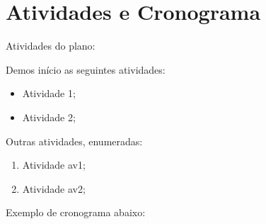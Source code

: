 \section{Atividades e Cronograma}
\label{sec:atividades}

\begin{large}

  Atividades do plano:

Demos início as seguintes atividades:
\begin{itemize}
\item Atividade 1;
\item Atividade 2;
\end{itemize}

Outras atividades, enumeradas:

\begin{enumerate}
	\item Atividade av1;
	\item Atividade av2;
\end{enumerate}

Exemplo de cronograma abaixo:

\setlength{\tabcolsep}{6pt}


\end{large}
